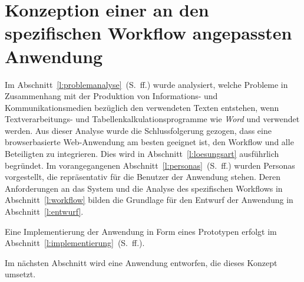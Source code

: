 \section{Konzeption einer an den spezifischen Workflow angepassten Anwendung}\label{l:konzeption}

Im Abschnitt~\ref{l:problemanalyse}~(S.\pageref{l:problemanalyse}~ff.) wurde analysiert, welche Probleme in Zusammenhang mit der Produktion von Informations- und Kommunikationsmedien bezüglich den verwendeten Texten entstehen, wenn Textverarbeitungs- und Tabellenkalkulationsprogramme wie  \emph{Word} und  verwendet werden. Aus dieser Analyse wurde die Schlussfolgerung gezogen, dass eine browserbasierte Web-Anwendung am besten geeignet ist, den Workflow und alle Beteiligten zu integrieren. Dies wird in Abschnitt~\ref{l:loesungsart} ausführlich begründet. Im vorangegangenen Abschnitt~\ref{l:personas}~(S.\pageref{l:personas}~ff.) wurden Personas vorgestellt, die repräsentativ für die Benutzer der Anwendung stehen. Deren Anforderungen an das System und die Analyse des spezifischen Workflows in Abschnitt~\ref{l:workflow} bilden die Grundlage für den Entwurf der Anwendung in Abschnitt~\ref{l:entwurf}.

\bigskip

Eine Implementierung der Anwendung in Form eines Prototypen erfolgt im Abschnitt~\ref{l:implementierung}~(S.\pageref{l:implementierung}~ff.).







\bigskip

Im nächsten Abschnitt wird eine Anwendung entworfen, die dieses Konzept umsetzt.

\pagebreak
